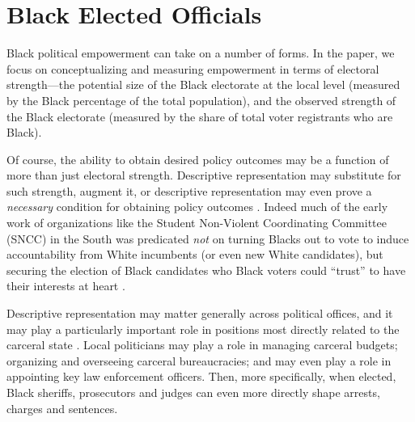 \documentclass[12pt]{article}
\begin{document}
\clearpage \newpage
\section{Black Elected Officials}\label{appendix_beo}
\setcounter{table}{0}
\setcounter{figure}{0}
\renewcommand{\thetable}{H\arabic{table}}
\renewcommand{\thefigure}{H\arabic{figure}}
\normalsize


Black political empowerment can take on a number of forms.  In the paper, we focus on conceptualizing and measuring empowerment in terms of electoral strength---the potential size of the Black electorate at the local level (measured by the Black percentage of the total population), and the observed strength of the Black electorate (measured by the share of total voter registrants who are Black).

Of course, the ability to obtain desired policy outcomes may be a function of more than just electoral strength.  Descriptive representation may substitute for such strength, augment it, or descriptive representation may even prove a \emph{necessary} condition for obtaining policy outcomes .  Indeed much of the early work of organizations like the Student Non-Violent Coordinating Committee (SNCC) in the South was predicated \emph{not} on turning Blacks out to vote to induce accountability from White incumbents (or even new White candidates), but securing the election of Black candidates who Black voters could ``trust'' to have their interests at heart .

Descriptive representation may matter generally across political offices, and it may play a particularly important role in positions most directly related to the carceral state .  Local politicians may play a role in managing carceral budgets; organizing and overseeing carceral bureaucracies; and may even play a role in appointing key law enforcement officers.  Then, more specifically, when elected, Black sheriffs, prosecutors and judges can even more directly shape arrests, charges and sentences.
\end{document}
